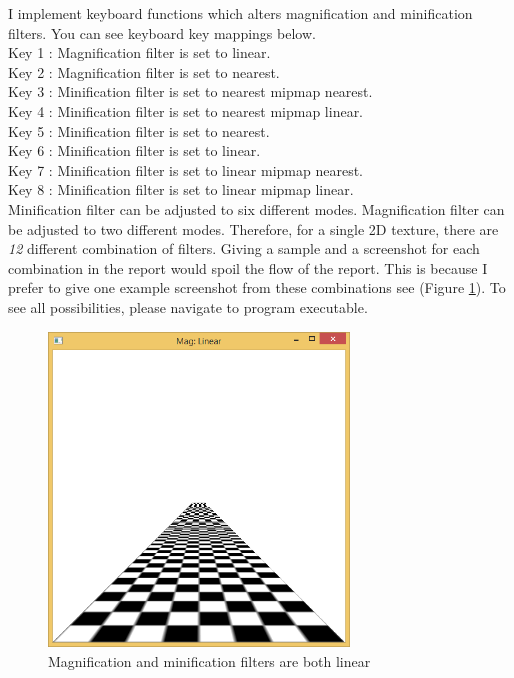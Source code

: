 I implement keyboard functions which alters magnification and minification filters. You can see keyboard key mappings below.\\
Key 1 : Magnification filter is set to linear.\\
Key 2 : Magnification filter is set to nearest.\\
Key 3 : Minification filter is set to nearest mipmap nearest. \\
Key 4 : Minification filter is set to nearest mipmap linear. \\
Key 5 : Minification filter is set to nearest. \\
Key 6 : Minification filter is set to linear. \\
Key 7 : Minification filter is set to linear mipmap nearest. \\
Key 8 : Minification filter is set to linear mipmap linear. \\
Minification filter can be adjusted to six different modes. Magnification filter can be adjusted to two different modes. Therefore, for a single 2D texture, there are \emph{12} different combination of filters. Giving a sample and a screenshot for each combination in the report would spoil the flow of the report. This is because I prefer to give one example screenshot from these combinations see (Figure \ref{fig:6-3-1}). To see all possibilities, please navigate to program executable.

\begin{figure}[hp]
\centering
\includegraphics[width=8cm]{../Screenshots/ex-6/3-1.png}
\caption{Magnification and minification filters are both linear}
\label{fig:6-3-1}
\end{figure}



